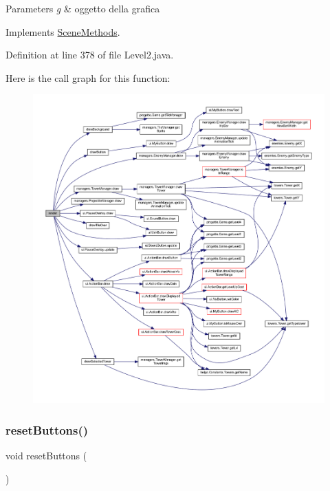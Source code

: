 \begin{DoxyParams}{Parameters}
{\em g} & oggetto della grafica \\
\hline
\end{DoxyParams}


Implements \hyperlink{interfacescenes_1_1_scene_methods_a203b6ad9d5e4d54dd1152986eec4dedc}{Scene\+Methods}.



Definition at line 378 of file Level2.\+java.

Here is the call graph for this function\+:\nopagebreak
\begin{figure}[H]
\begin{center}
\leavevmode
\includegraphics[width=350pt]{classscenes_1_1_level2_a203b6ad9d5e4d54dd1152986eec4dedc_cgraph}
\end{center}
\end{figure}
\mbox{\label{classscenes_1_1_level2_a548cf4795e9d559d0c0cce0bb57a5251}} 
\subsubsection{\texorpdfstring{reset\+Buttons()}{resetButtons()}}
{\footnotesize\ttfamily void reset\+Buttons (\begin{DoxyParamCaption}{ }\end{DoxyParamCaption})\hspace{0.3cm}{\ttfamily [private]}}




